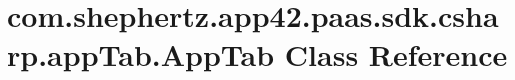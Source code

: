 \hypertarget{classcom_1_1shephertz_1_1app42_1_1paas_1_1sdk_1_1csharp_1_1app_tab_1_1_app_tab}{\section{com.\+shephertz.\+app42.\+paas.\+sdk.\+csharp.\+app\+Tab.\+App\+Tab Class Reference}
\label{classcom_1_1shephertz_1_1app42_1_1paas_1_1sdk_1_1csharp_1_1app_tab_1_1_app_tab}
}
